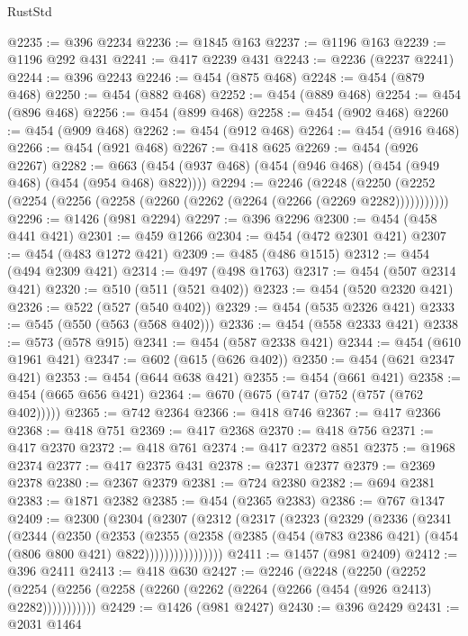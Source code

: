 \begin{lexlean}{RustStd}
\begin{coremodule}
@2235 := @396 @2234
@2236 := @1845 @163
@2237 := @1196 @163
@2239 := @1196 @292 @431
@2241 := @417 @2239 @431
@2243 := @2236 (@2237 @2241)
@2244 := @396 @2243
@2246 := @454 (@875 @468)
@2248 := @454 (@879 @468)
@2250 := @454 (@882 @468)
@2252 := @454 (@889 @468)
@2254 := @454 (@896 @468)
@2256 := @454 (@899 @468)
@2258 := @454 (@902 @468)
@2260 := @454 (@909 @468)
@2262 := @454 (@912 @468)
@2264 := @454 (@916 @468)
@2266 := @454 (@921 @468)
@2267 := @418 @625
@2269 := @454 (@926 @2267)
@2282 := @663 (@454 (@937 @468) (@454 (@946 @468) (@454 (@949 @468) (@454 (@954 @468) @822))))
@2294 := @2246
    (@2248 (@2250 (@2252 (@2254 (@2256 (@2258 (@2260 (@2262 (@2264 (@2266 (@2269 @2282)))))))))))
@2296 := @1426 (@981 @2294)
@2297 := @396 @2296
@2300 := @454 (@458 @441 @421)
@2301 := @459 @1266
@2304 := @454 (@472 @2301 @421)
@2307 := @454 (@483 @1272 @421)
@2309 := @485 (@486 @1515)
@2312 := @454 (@494 @2309 @421)
@2314 := @497 (@498 @1763)
@2317 := @454 (@507 @2314 @421)
@2320 := @510 (@511 (@521 @402))
@2323 := @454 (@520 @2320 @421)
@2326 := @522 (@527 (@540 @402))
@2329 := @454 (@535 @2326 @421)
@2333 := @545 (@550 (@563 (@568 @402)))
@2336 := @454 (@558 @2333 @421)
@2338 := @573 (@578 @915)
@2341 := @454 (@587 @2338 @421)
@2344 := @454 (@610 @1961 @421)
@2347 := @602 (@615 (@626 @402))
@2350 := @454 (@621 @2347 @421)
@2353 := @454 (@644 @638 @421)
@2355 := @454 (@661 @421)
@2358 := @454 (@665 @656 @421)
@2364 := @670 (@675 (@747 (@752 (@757 (@762 @402)))))
@2365 := @742 @2364
@2366 := @418 @746
@2367 := @417 @2366
@2368 := @418 @751
@2369 := @417 @2368
@2370 := @418 @756
@2371 := @417 @2370
@2372 := @418 @761
@2374 := @417 @2372 @851
@2375 := @1968 @2374
@2377 := @417 @2375 @431
@2378 := @2371 @2377
@2379 := @2369 @2378
@2380 := @2367 @2379
@2381 := @724 @2380
@2382 := @694 @2381
@2383 := @1871 @2382
@2385 := @454 (@2365 @2383)
@2386 := @767 @1347
@2409 := @2300
    (@2304
      (@2307
        (@2312
          (@2317
            (@2323
              (@2329
                (@2336
                  (@2341
                    (@2344
                      (@2350
                        (@2353
                          (@2355
                            (@2358
                              (@2385
                                (@454 (@783 @2386 @421) (@454 (@806 @800 @421) @822))))))))))))))))
@2411 := @1457 (@981 @2409)
@2412 := @396 @2411
@2413 := @418 @630
@2427 := @2246
    (@2248
      (@2250
        (@2252 (@2254 (@2256 (@2258 (@2260 (@2262 (@2264 (@2266 (@454 (@926 @2413) @2282)))))))))))
@2429 := @1426 (@981 @2427)
@2430 := @396 @2429
@2431 := @2031 @1464

\end{coremodule}
\end{lexlean}
